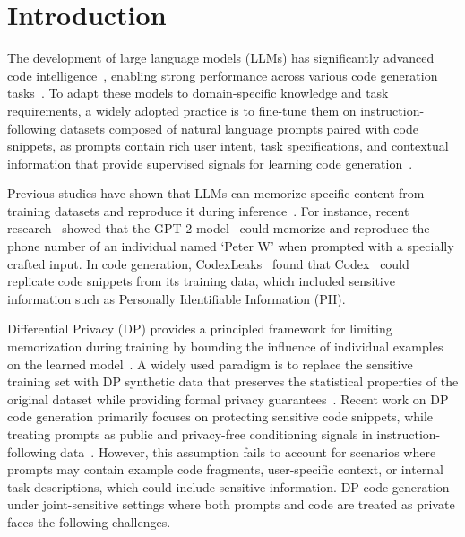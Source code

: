 \documentclass{article}
\theoremstyle{plain}
\theoremstyle{definition}
\theoremstyle{remark}
\begin{document}
\section{Introduction}

The development of large language models (LLMs) has significantly advanced code intelligence~\cite{Qwen2.5_Coder, codellama}, enabling strong performance across various code generation tasks~\cite{liu2023your, zhuo2024bigcodebenchbenchmarkingcodegeneration,zhuo-etal-2025-nlp}. To adapt these models to domain-specific knowledge and task requirements, a widely adopted practice is to fine-tune them on instruction-following datasets composed of natural language prompts paired with code snippets, as prompts contain rich user intent, task specifications, and contextual information that provide supervised signals for learning code generation~\cite{ahmad2025opencodeinstruct}. 

Previous studies have shown that LLMs can memorize specific content from training datasets and reproduce it during inference~\cite{carlini2022quantifying,carlini2021extracting,nasr2023scalable}. For instance, recent research~\cite{carlini2021extracting} showed that the GPT-2 model~\cite{radford2019language} could memorize and reproduce the phone number of an individual named `Peter W' when prompted with a specially crafted input. In code generation, CodexLeaks~\cite{codexleaks} found that Codex~\cite{chen2021evaluating} could replicate code snippets from its training data, which included sensitive information such as Personally Identifiable Information (PII). 


Differential Privacy (DP) provides a principled framework for limiting memorization during training by bounding the influence of individual examples on the learned model~\cite{dwork2006calibrating}. A widely used paradigm is to replace the sensitive training set with DP synthetic data that preserves the statistical properties of the original dataset while providing formal privacy guarantees~\cite{yue2023synthetic,li2024privimage,gong2025privorl,gong2026easy,gong2025dpimagebench}. Recent work on DP code generation 
primarily focuses on protecting sensitive code snippets, while treating prompts as public and privacy-free conditioning signals in instruction-following data~\cite{liu2025privcode}. However, this assumption fails to account for scenarios where prompts may contain example code fragments, user-specific context, or internal task descriptions, which could include sensitive information. DP code generation under joint-sensitive settings where both prompts and code are treated as private faces the following challenges.
\end{document}
